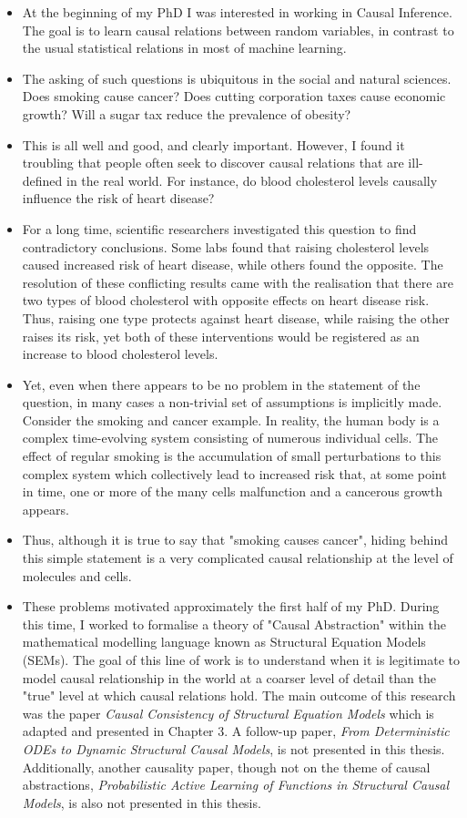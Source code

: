 \begin{itemize}
\item At the beginning of my PhD I was interested in working in Causal Inference. The goal is to learn causal relations between random variables, in contrast to the usual statistical relations in most of machine learning. 
\item The asking of such questions is ubiquitous in the social and natural sciences. Does smoking cause cancer? Does cutting corporation taxes cause economic growth? Will a sugar tax reduce the prevalence of obesity?
\item This is all well and good, and clearly important. However, I found it troubling that people often seek to discover causal relations that are ill-defined in the real world. For instance, do blood cholesterol levels causally influence the risk of heart disease? 
\item For a long time, scientific researchers investigated this question to find contradictory conclusions. Some labs found that raising cholesterol levels caused increased risk of heart disease, while others found the opposite. The resolution of these conflicting results came with the realisation that there are two types of blood cholesterol with opposite effects on heart disease risk. Thus, raising one type protects against heart disease, while raising the other raises its risk, yet both of these interventions would be registered as an increase to blood cholesterol levels.
\item Yet, even when there appears to be no problem in the statement of the question, in many cases a non-trivial set of assumptions is implicitly made. Consider the smoking and cancer example. In reality, the human body is a complex time-evolving system consisting of numerous individual cells. The effect of regular smoking is the accumulation of small perturbations to this complex system which collectively lead to increased risk that, at some point in time, one or more of the many cells malfunction and a cancerous growth appears. 
\item Thus, although it is true to say that "smoking causes cancer", hiding behind this simple statement is a very complicated causal relationship at the level of molecules and cells.
\item These problems motivated approximately the first half of my PhD. During this time, I worked to formalise a theory of "Causal Abstraction" within the mathematical modelling language known as Structural Equation Models (SEMs). The goal of this line of work is to understand when it is legitimate to model causal relationship in the world at a coarser level of detail than the "true" level at which causal relations hold. The main outcome of this research was the paper \emph{Causal Consistency of Structural Equation Models} which is adapted and presented in Chapter 3. A follow-up paper, \emph{From Deterministic ODEs to Dynamic Structural Causal Models}, is not presented in this thesis. Additionally, another causality paper, though not on the theme of causal abstractions, \emph{Probabilistic Active Learning of Functions in Structural Causal Models}, is also not presented in this thesis.
\end{itemize}


